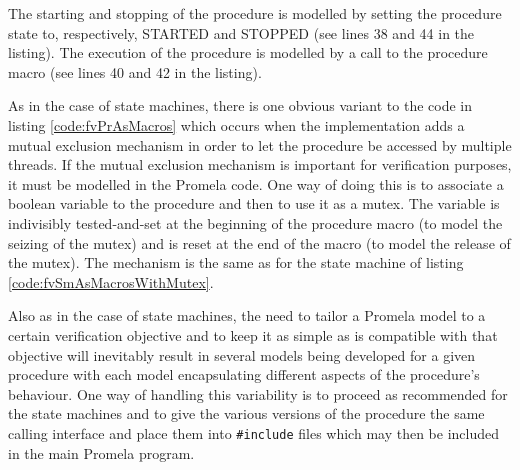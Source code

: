 \documentclass[a4paper,10pt]{article}
\begin{document}
The starting and stopping of the procedure is modelled by setting the procedure state to, respectively, STARTED and STOPPED (see lines 38 and 44 in the listing). The execution of the procedure is modelled by a call to the procedure macro (see lines 40 and 42 in the listing).

As in the case of state machines, there is one obvious variant to the code in listing \ref{code:fvPrAsMacros} which occurs when the implementation adds a mutual exclusion mechanism in order to let the procedure be accessed by multiple threads. If the mutual exclusion mechanism is important for verification purposes, it must be modelled in the Promela code. One way of doing this is to associate a boolean variable to the procedure and then to use it as a mutex. The variable is indivisibly tested-and-set at the beginning of the procedure macro (to model the seizing of the mutex) and is reset at the end of the macro (to model the release of the mutex). The mechanism is the same as for the state machine of listing \ref{code:fvSmAsMacrosWithMutex}.

Also as in the case of state machines, the need to tailor a Promela model to a certain verification objective and to keep it as simple as is compatible with that objective will inevitably result in several models being developed for a given procedure with each model encapsulating different aspects of the procedure's behaviour. One way of handling this variability is to proceed as recommended for the state machines and to give the various versions of the procedure the same calling interface and place them into \texttt{\#include} files which may then be included in the main Promela program. 
\end{document}
